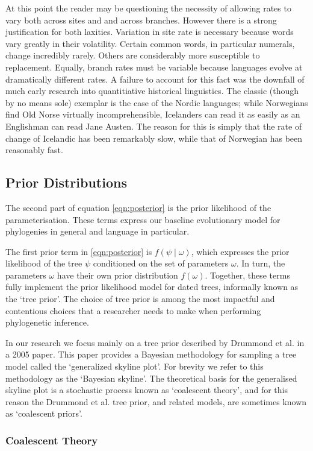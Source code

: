\documentclass[10pt,journal,compsoc]{IEEEtran}
\begin{document}
At this point the reader may be questioning the necessity of allowing rates to vary both across sites and and across branches. However there is a strong justification for both laxities. Variation in site rate is necessary because words vary greatly in their volatility. Certain common words, in particular numerals, change incredibly rarely. Others are considerably more susceptible to replacement. Equally, branch rates must be variable because languages evolve at dramatically different rates. A failure to account for this fact was the downfall of much early research into quantitiative historical linguistics. The classic (though by no means sole) exemplar is the case of the Nordic languages; while Norwegians find Old Norse virtually incomprehensible, Icelanders can read it as easily as an Englishman can read Jane Austen. The reason for this is simply that the rate of change of Icelandic has been remarkably slow, while that of Norwegian has been reasonably fast.

\subsection{Prior Distributions}

The second part of equation \eqref{eqn:posterior} is the prior likelihood of the parameterisation. These terms express our baseline evolutionary model for phylogenies in general and language in particular.

The first prior term in \eqref{eqn:posterior} is $f(\psi\;|\;\omega)$, which expresses the prior likelihood of the tree $\psi$ conditioned on the set of parameters $\omega$. In turn, the parameters $\omega$ have their own prior distribution $f(\omega)$. Together, these terms fully implement the prior likelihood model for dated trees, informally known as the `tree prior'. The choice of tree prior is among the most impactful and contentious choices that a researcher needs to make when performing phylogenetic inference.

In our research we focus mainly on a tree prior described by Drummond et al. in a 2005 paper. This paper provides a Bayesian methodology for sampling a tree model called the `generalized skyline plot'. For brevity we refer to this methodology as the `Bayesian skyline'. The theoretical basis for the generalised skyline plot is a stochastic process known as `coalescent theory', and for this reason the Drummond et al. tree prior, and related models, are sometimes known as `coalescent priors'.

\subsubsection{Coalescent Theory}
\end{document}
